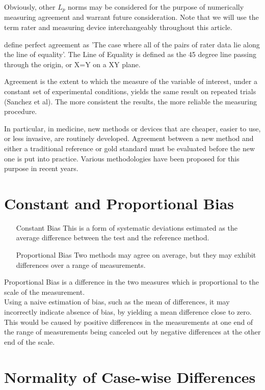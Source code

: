 \documentclass[12pt, a4paper]{report}
\begin{document}
Obviously, other $L_p$ norms may be considered for the purpose of numerically measuring agreement and warrant future consideration. Note that we will use the term rater and measuring device interchangeably throughout this article.

\citet{BA86} define perfect agreement as 'The case where all of the pairs of rater data lie
along the line of equality'. The Line of Equality is defined as the 45 degree line passing through the origin, or X=Y on a XY plane.

Agreement is the extent to which the measure of the variable of interest, under a constant set of experimental conditions, yields the same result on repeated trials (Sanchez et al). The more consistent the results, the more reliable the measuring procedure.

In particular, in medicine, new methods or devices that are cheaper, easier to use, or less invasive, are routinely developed. Agreement between a new method and either a traditional reference or gold standard must be evaluated before the new one is put into practice. Various methodologies have been proposed for this purpose in recent years.

\section{Constant and Proportional Bias}
\begin{itemize}
\item[Constant Bias] This is a form of systematic deviations estimated as the average difference between the test
and the reference method.
\item[Proportional Bias] Two methods may agree on average, but they may exhibit differences over a range of measurements.
\end{itemize}

Proportional Bias is a difference in the two measures which is proportional to the scale of the measurement. \\Using a naive estimation of bias, such as the mean of differences, it may incorrectly indicate absence of bias, by yielding a mean difference close to zero. This would be caused by positive differences in the measurements at one end of the range of measurements being canceled out by negative differences at the other end of the scale.

\section{Normality of Case-wise Differences}
\end{document}
